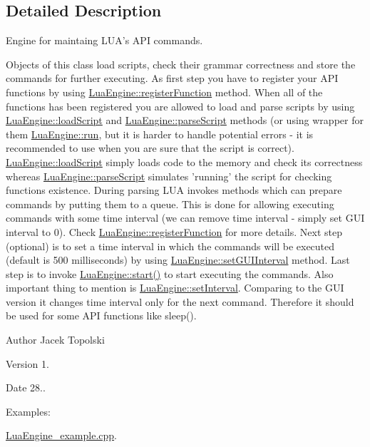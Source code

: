 \subsection{Detailed Description}
Engine for maintaing L\-U\-A's A\-P\-I commands. 

Objects of this class load scripts, check their grammar correctness and store the commands for further executing. As first step you have to register your A\-P\-I functions by using \hyperlink{class_lua_engine_a03530362918aceccd6f69a5cecf2a968}{Lua\-Engine\-::register\-Function} method. When all of the functions has been registered you are allowed to load and parse scripts by using \hyperlink{class_lua_engine_aab9337ae5ea59bccc1e08c4015d42700}{Lua\-Engine\-::load\-Script} and \hyperlink{class_lua_engine_a5eae05f78704166f098ea20568c23fd7}{Lua\-Engine\-::parse\-Script} methods (or using wrapper for them \hyperlink{class_lua_engine_a38430b2be86fac999acd740423ec1fc8}{Lua\-Engine\-::run}, but it is harder to handle potential errors -\/ it is recommended to use when you are sure that the script is correct). \hyperlink{class_lua_engine_aab9337ae5ea59bccc1e08c4015d42700}{Lua\-Engine\-::load\-Script} simply loads code to the memory and check its correctness whereas \hyperlink{class_lua_engine_a5eae05f78704166f098ea20568c23fd7}{Lua\-Engine\-::parse\-Script} simulates 'running' the script for checking functions existence. During parsing L\-U\-A invokes methods which can prepare commands by putting them to a queue. This is done for allowing executing commands with some time interval (we can remove time interval -\/ simply set G\-U\-I interval to 0). Check \hyperlink{class_lua_engine_a03530362918aceccd6f69a5cecf2a968}{Lua\-Engine\-::register\-Function} for more details. Next step (optional) is to set a time interval in which the commands will be executed (default is 500 milliseconds) by using \hyperlink{class_lua_engine_ac29f2b09b45797aac68bd5caa6fe2c90}{Lua\-Engine\-::set\-G\-U\-I\-Interval} method. Last step is to invoke \hyperlink{class_lua_engine_a28e0795b54170d763a929256566fe2b5}{Lua\-Engine\-::start()} to start executing the commands. Also important thing to mention is \hyperlink{class_lua_engine_a0b87a8b474070665af6e435a2c5bce56}{Lua\-Engine\-::set\-Interval}. Comparing to the G\-U\-I version it changes time interval only for the next command. Therefore it should be used for some A\-P\-I functions like sleep(). \begin{DoxyAuthor}{Author}
Jacek Topolski 
\end{DoxyAuthor}
\begin{DoxyVersion}{Version}
1. 
\end{DoxyVersion}
\begin{DoxyDate}{Date}
28.. 
\end{DoxyDate}
\begin{Desc}
\item[Examples\-: ]\par
\hyperlink{_lua_engine_example_8cpp-example}{Lua\-Engine\-\_\-example.\-cpp}.\end{Desc}


